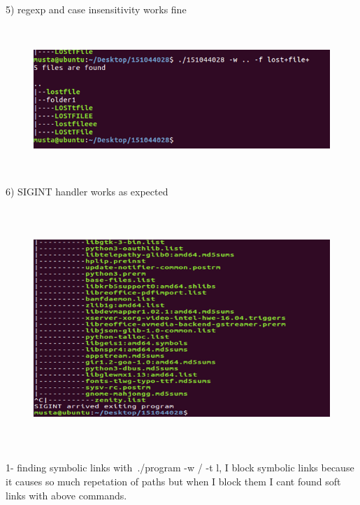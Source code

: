 \documentclass[14pt]{article}
\begin{document}
\vspace{\baselineskip}

\vspace{\baselineskip}

\vspace{\baselineskip}

\vspace{\baselineskip}





5) regexp and case insensitivity works fine

\vspace{\baselineskip}




\begin{figure}[H]
	\begin{Center}
		\includegraphics[width=6.5in,height=2.16in]{./media/image4.png}
	\end{Center}
\end{figure}






6) SIGINT handler works as expected




\begin{figure}[H]
	\begin{Center}
		\includegraphics[width=5.96in,height=3.57in]{./media/image5.png}
	\end{Center}
\end{figure}





1- finding symbolic links with\  ./program -w / -t l, I block symbolic links because it causes so much repetation of paths but when I block them I cant found soft links with above commands. 
\printbibliography
\end{document}
